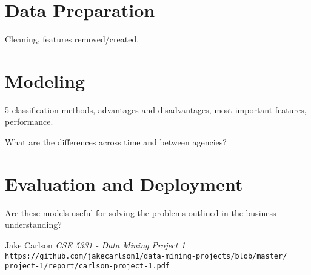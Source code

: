 \documentclass{article}
\begin{document}
\section{Data Preparation}
Cleaning, features removed/created.

\section{Modeling}
5 classification methods, advantages and disadvantages, most important features, performance.

What are the differences across time and between agencies?

\section{Evaluation and Deployment}
Are these models useful for solving the problems outlined in the business understanding?

\begin{thebibliography}{10}
    Jake Carlson
    \textit{CSE 5331 - Data Mining Project 1}
    \texttt{https://github.com/jakecarlson1/data-mining-projects/blob/master/}
    \texttt{project-1/report/carlson-project-1.pdf}

\end{thebibliography}
\end{document}
